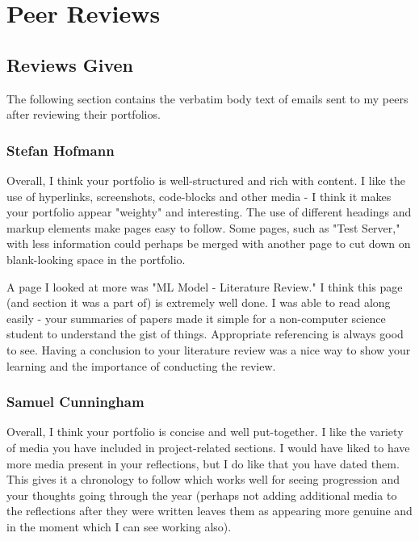 \documentclass[11pt]{article}
\begin{document}
\section{Peer Reviews}

\subsection{Reviews Given}

The following section contains the verbatim body text of emails sent to my peers after reviewing their portfolios.

\subsubsection{Stefan Hofmann}

Overall, I think your portfolio is well-structured and rich with content. I like the use of hyperlinks, screenshots, code-blocks and other media - I think it makes your portfolio appear "weighty" and interesting. The use of different headings and markup elements make pages easy to follow. Some pages, such as "Test Server," with less information could perhaps be merged with another page to cut down on blank-looking space in the portfolio.

A page I looked at more was "ML Model - Literature Review." I think this page (and section it was a part of) is extremely well done. I was able to read along easily - your summaries of papers made it simple for a non-computer science student to understand the gist of things. Appropriate referencing is always good to see. Having a conclusion to your literature review was a nice way to show your learning and the importance of conducting the review.

\subsubsection{Samuel Cunningham}

Overall, I think your portfolio is concise and well put-together. I like the variety of media you have included in project-related sections. I would have liked to have more media present in your reflections, but I do like that you have dated them. This gives it a chronology to follow which works well for seeing progression and your thoughts going through the year (perhaps not adding additional media to the reflections after they were written leaves them as appearing more genuine and in the moment which I can see working also).
\end{document}
